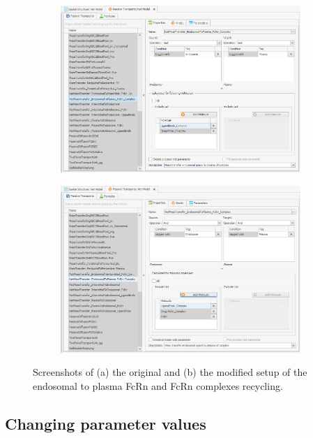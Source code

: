 \documentclass[fleqn,10pt]{physiome}
\begin{document}
\begin{figure}[htb]\centering
    \begin{subfigure}{0.49\textwidth}
        \includegraphics[width=\textwidth]{Picture4.png}
        \caption{}
        \label{pic:2a}
    \end{subfigure}
    \hfill
    \begin{subfigure}{0.49\textwidth}
        \includegraphics[width=\textwidth]{Picture5.png}
        \caption{}
        \label{pic:2b}
    \end{subfigure}
    \caption{Screenshots of (a) the original and (b) the modified setup of the endosomal to plasma FcRn and FcRn complexes recycling.}
    \label{pic2}
\end{figure}



\subsection{Changing parameter values}
\end{document}

